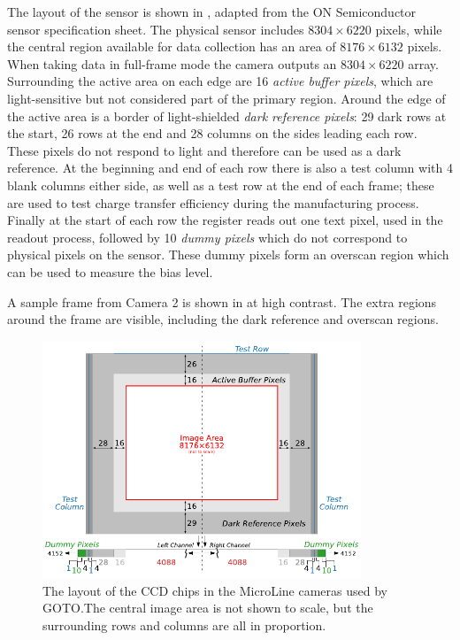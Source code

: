 \begin{colsection}
\begin{colsection}
The layout of the sensor is shown in , adapted from the ON Semiconductor sensor specification sheet. The physical sensor includes $8304 \times 6220$ pixels, while the central region available for data collection has an area of $8176 \times 6132$ pixels. When taking data in full-frame mode the camera outputs an $8304 \times 6220$ array. Surrounding the active area on each edge are 16 \emph{active buffer pixels}, which are light-sensitive but not considered part of the primary region. Around the edge of the active area is a border of light-shielded \emph{dark reference pixels}: 29 dark rows at the start, 26 rows at the end and 28 columns on the sides leading each row. These pixels do not respond to light and therefore can be used as a dark reference. At the beginning and end of each row there is also a test column with 4 blank columns either side, as well as a test row at the end of each frame; these are used to test charge transfer efficiency during the manufacturing process. Finally at the start of each row the register reads out one text pixel, used in the readout process, followed by 10 \emph{dummy pixels} which do not correspond to physical pixels on the sensor. These dummy pixels form an overscan region which can be used to measure the bias level.

A sample frame from Camera 2 is shown in  at high contrast. The extra regions around the frame are visible, including the dark reference and overscan regions.

\begin{figure}[p]
    \begin{center}
        \includegraphics[width=0.85\textwidth]{images/chip}
    \end{center}
    \caption[The layout of the CCD chips in the MicroLine cameras used by GOTO]{
        The layout of the CCD chips in the MicroLine cameras used by GOTO.\@ The central image area is not shown to scale, but the surrounding rows and columns are all in proportion.
    }\label{fig:chip}
\end{figure}


\end{colsection}
\end{colsection}
